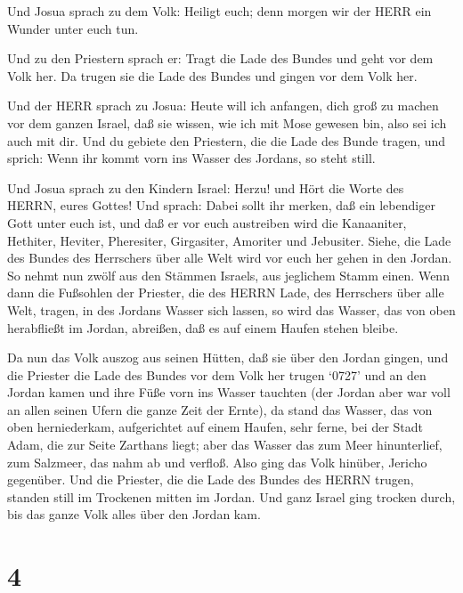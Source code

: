  Und Josua sprach zu dem Volk: Heiligt euch; denn morgen wir
der HERR ein Wunder unter euch tun.

 Und zu den Priestern sprach er: Tragt die Lade des Bundes
und geht vor dem Volk her. Da trugen sie die Lade des Bundes und gingen
vor dem Volk her.

 Und der HERR sprach zu Josua: Heute will ich anfangen, dich
groß zu machen vor dem ganzen Israel, daß sie wissen, wie ich mit Mose
gewesen bin, also sei ich auch mit dir.  Und du gebiete den
Priestern, die die Lade des Bunde tragen, und sprich: Wenn ihr kommt
vorn ins Wasser des Jordans, so steht still.

 Und Josua sprach zu den Kindern Israel: Herzu! und Hört die
Worte des HERRN, eures Gottes!  Und sprach: Dabei sollt ihr
merken, daß ein lebendiger Gott unter euch ist, und daß er vor euch
austreiben wird die Kanaaniter, Hethiter, Heviter, Pheresiter,
Girgasiter, Amoriter und Jebusiter.  Siehe, die Lade des
Bundes des Herrschers über alle Welt wird vor euch her gehen in den
Jordan.  So nehmt nun zwölf aus den Stämmen Israels, aus
jeglichem Stamm einen.  Wenn dann die Fußsohlen der
Priester, die des HERRN Lade, des Herrschers über alle Welt, tragen, in
des Jordans Wasser sich lassen, so wird das Wasser, das von oben
herabfließt im Jordan, abreißen, daß es auf einem Haufen stehen bleibe.

 Da nun das Volk auszog aus seinen Hütten, daß sie über den
Jordan gingen, und die Priester die Lade des Bundes vor dem Volk her
trugen  `0727' und an den Jordan kamen und ihre Füße vorn
ins Wasser tauchten (der Jordan aber war voll an allen seinen Ufern die
ganze Zeit der Ernte),  da stand das Wasser, das von oben
herniederkam, aufgerichtet auf einem Haufen, sehr ferne, bei der Stadt
Adam, die zur Seite Zarthans liegt; aber das Wasser das zum Meer
hinunterlief, zum Salzmeer, das nahm ab und verfloß. Also ging das Volk
hinüber, Jericho gegenüber.  Und die Priester, die die Lade
des Bundes des HERRN trugen, standen still im Trockenen mitten im
Jordan. Und ganz Israel ging trocken durch, bis das ganze Volk alles
über den Jordan kam.

\hypertarget{section-3}{%
\section{4}\label{section-3}}

